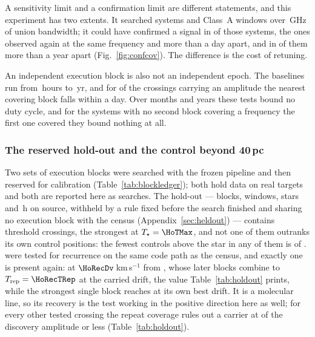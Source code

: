 A sensitivity limit and a confirmation limit are different statements, and
this experiment has two extents. It searched \RcSearchSys{} systems and
\RcSearchWin{} Class~A windows over \CvUnionA\,GHz of union bandwidth; it
could have confirmed a signal in \RcConfSysDay{} of those systems, the ones
observed again at the same frequency and more than a day apart, and in
\RcConfSysYr{} of them more than a year apart (Fig.~\ref{fig:confcov}). The
difference is the cost of retuning.

An independent execution block is also not an independent epoch. The
baselines run from \RcSepMinH\,hours to \RcSepMaxYr\,yr, and for
\RcNSepSameDay{} of the \RcNExclPoss{} crossings carrying an amplitude the
nearest covering block falls within a day. Over months and years these tests
bound no duty cycle, and for the \RcNoRepSysAll{} systems with no second
block covering a frequency the first one covered they bound nothing at all.

\subsubsection{The reserved hold-out and the control beyond 40\,pc}
\label{sec:holdoutsearch}

Two sets of execution blocks were searched with the frozen pipeline and then
reserved for calibration (Table~\ref{tab:blockledger}); both hold data on real
targets and both are reported here as searches. The hold-out --- \HoNBlock{}
blocks, \HoNWin{} windows, \HoNStar{} stars and \HoHours\,h on source,
withheld by a rule fixed before the search finished and sharing no execution
block with the census (Appendix~\ref{sec:heldout}) --- contains \HoNCross{}
threshold crossings, the strongest at $T_\star=\HoTMax$, and not one of them
outranks its own control positions: the fewest controls above the star in any
of them is \HoNCtrlMin{} of \NCtrl. \HoNTested{} were tested for recurrence on the same
code path as the census, and exactly one is present again: \HoRecStar{} at
$\HoRecDv$\,km\,s$^{-1}$ from \HoRecLine, whose \HoRecNRep{} later blocks
combine to $T_{\rm rep}=\HoRecTRep$ at the carried drift, the value
Table~\ref{tab:holdout} prints, while the strongest single block reaches
\HoRecTAnyDrift{} at its own best drift. It is a molecular line, so its
recovery is the test working in the positive direction here as well; for
every other tested crossing the repeat coverage rules out a carrier at
\HoFracMax{} of the discovery amplitude or less (Table~\ref{tab:holdout}).

